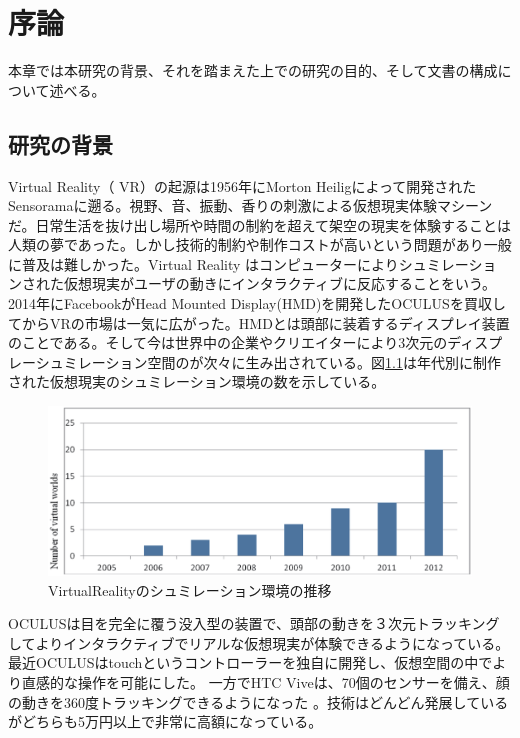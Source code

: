 \chapter{序論}
\label{chap:introduction}

本章では本研究の背景、それを踏まえた上での研究の目的、そして文書の構成について述べる。

\section{研究の背景}
Virtual Reality（ VR）の起源は1956年にMorton Heiligによって開発されたSensoramaに遡る。視野、音、振動、香りの刺激による仮想現実体験マシーンだ\cite{sensorama}。日常生活を抜け出し場所や時間の制約を超えて架空の現実を体験することは人類の夢であった\cite{verge}。しかし技術的制約や制作コストが高いという問題があり一般に普及は難しかった。Virtual Reality はコンピューターによりシュミレーショ ンされた仮想現実がユーザの動きにインタラクティブに反応することをいう。\\

2014年にFacebookがHead Mounted Display(HMD)を開発したOCULUSを買収してからVRの市場は一気に広がった\cite{vrtrendShiny}。HMDとは頭部に装着するディスプレイ装置のことである。そして今は世界中の企業やクリエイターにより3次元のディスプレーシュミレーション空間のが次々に生み出されている。図\ref{trends}は年代別に制作された仮想現実のシュミレーション環境の数を示している\cite{vrtrendSamuel}。\\
\begin{figure}[htbp]
\begin{center}
\includegraphics[width=15cm]{eps/vrTrends.eps}
\caption{VirtualRealityのシュミレーション環境の推移}
\label{trends}
\end{center}
\end{figure}

OCULUSは目を完全に覆う没入型の装置で、頭部の動きを３次元トラッキングしてよりインタラクティブでリアルな仮想現実が体験できるようになっている。最近OCULUSはtouchというコントローラーを独自に開発し、仮想空間の中でより直感的な操作を可能にした\cite{touch}。
一方でHTC Viveは、70個のセンサーを備え、顔の動きを360度トラッキングできるようになった \cite{vive}。技術はどんどん発展しているがどちらも5万円以上で非常に高額になっている。\\

